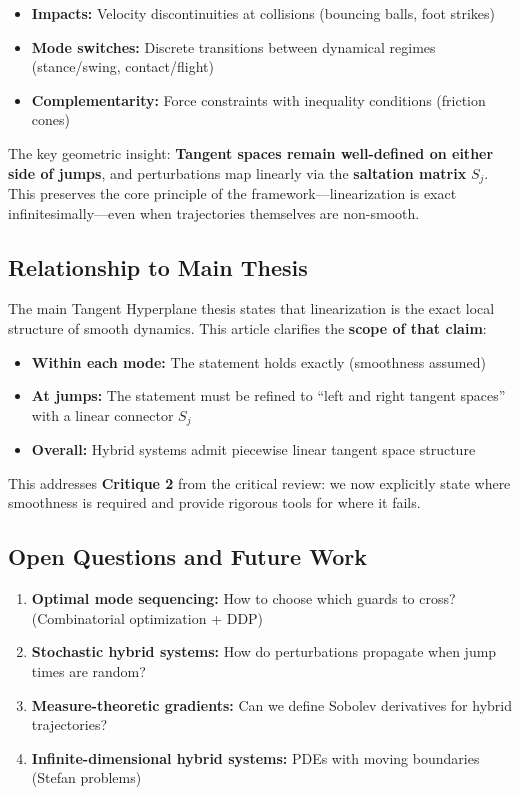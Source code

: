 \documentclass[
  letterpaper,
  DIV=11,
  numbers=noendperiod]{scrartcl}
\providecommand{\tightlist}{%
  \setlength{\itemsep}{0pt}\setlength{\parskip}{0pt}}\usepackage{longtable,booktabs,array}
\begin{document}
\begin{itemize}
\tightlist
\item
  \textbf{Impacts:} Velocity discontinuities at collisions (bouncing
  balls, foot strikes)
\item
  \textbf{Mode switches:} Discrete transitions between dynamical regimes
  (stance/swing, contact/flight)
\item
  \textbf{Complementarity:} Force constraints with inequality conditions
  (friction cones)
\end{itemize}

The key geometric insight: \textbf{Tangent spaces remain well-defined on
either side of jumps}, and perturbations map linearly via the
\textbf{saltation matrix} \(S_j\). This preserves the core principle of
the framework---linearization is exact infinitesimally---even when
trajectories themselves are non-smooth.

\subsection{Relationship to Main
Thesis}\label{relationship-to-main-thesis}

The main Tangent Hyperplane thesis states that linearization is the
exact local structure of smooth dynamics. This article clarifies the
\textbf{scope of that claim}:

\begin{itemize}
\tightlist
\item
  \textbf{Within each mode:} The statement holds exactly (smoothness
  assumed)
\item
  \textbf{At jumps:} The statement must be refined to ``left and right
  tangent spaces'' with a linear connector \(S_j\)
\item
  \textbf{Overall:} Hybrid systems admit piecewise linear tangent space
  structure
\end{itemize}

This addresses \textbf{Critique 2} from the critical review: we now
explicitly state where smoothness is required and provide rigorous tools
for where it fails.

\subsection{Open Questions and Future
Work}\label{open-questions-and-future-work}

\begin{enumerate}
\def\labelenumi{\arabic{enumi}.}
\tightlist
\item
  \textbf{Optimal mode sequencing:} How to choose which guards to cross?
  (Combinatorial optimization + DDP)
\item
  \textbf{Stochastic hybrid systems:} How do perturbations propagate
  when jump times are random?
\item
  \textbf{Measure-theoretic gradients:} Can we define Sobolev
  derivatives for hybrid trajectories?
\item
  \textbf{Infinite-dimensional hybrid systems:} PDEs with moving
  boundaries (Stefan problems)
\end{enumerate}
\end{document}
